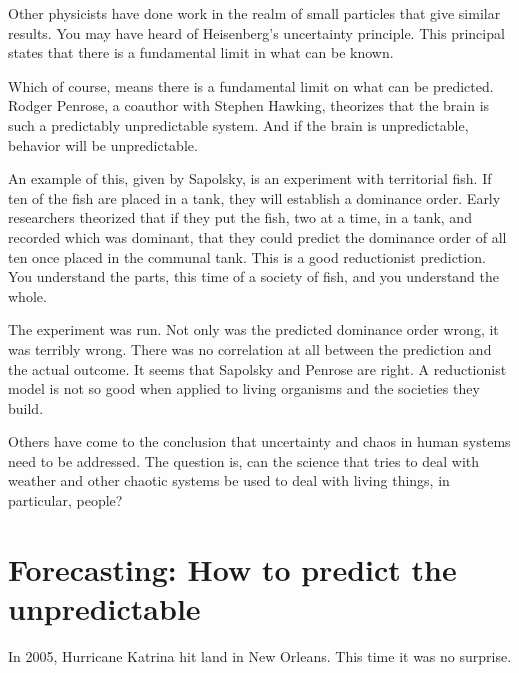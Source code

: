 \documentclass{article}
\begin{document}
Other physicists have done work in the realm of small particles that give
similar results. You may have heard of Heisenberg's uncertainty principle.
This principal states that there is a fundamental limit in what can be known.


Which of course, means there is a fundamental limit on what can be
predicted. Rodger Penrose, a coauthor with Stephen Hawking, theorizes that
the brain is such a predictably unpredictable system.\cite{Penrose} And if
the brain is unpredictable, behavior will be unpredictable.

An example of this, given by Sapolsky, is an experiment with territorial
fish. If ten of the fish are placed in a tank, they will establish a
dominance order. Early researchers theorized that if they put the fish, two
at a time, in a tank, and recorded which was dominant, that they could
predict the dominance order of all ten once placed in the communal tank.
This is a good reductionist prediction. You understand the parts, this time
of a society of fish, and you understand the whole.

The experiment was run. Not only was the predicted dominance order wrong, it
was terribly wrong. There was no correlation at all between the prediction
and the actual outcome. It seems that Sapolsky and Penrose are right. A
reductionist model is not so good when applied to living organisms and the
societies they build.\cite{Sapolsky}

Others have come to the conclusion that uncertainty and chaos in human
systems need to be addressed.\cite{Wheatley}\cite{Tobak} The question is,
can the science that tries to deal with weather and other chaotic systems be
used to deal with living things, in particular, people?

\section{Forecasting: How to predict the unpredictable}

In 2005, Hurricane Katrina hit land in New Orleans. This time it was no
surprise.
\end{document}
